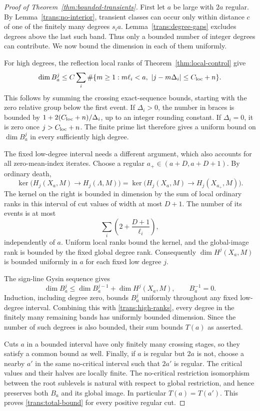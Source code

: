 \begin{proof}[Proof of Theorem~\ref{thm:bounded-transients}]
First let $a$ be large with $2a$ regular.  By
Lemma~\ref{trans:no-interior}, transient classes can occur only within
distance $c$ of one of the finitely many degrees $s_i a$.
Lemma~\ref{trans:degree-gaps} excludes degrees above the last such
band.  Thus only a bounded number of integer degrees can contribute.
We now bound the dimension in each of them uniformly.

For high degrees, the reflection local ranks of
Theorem~\ref{thm:local-control} give
\begin{equation}\label{trans:high-ranks}
 \dim B_a^j
 \le C\sum_i\#\{m\ge1:m\ell_i<a,\ |j-m\Delta_i|\le C_{\rm loc}+n\}.
\end{equation}
This follows by summing the crossing exact-sequence bounds, starting
with the zero relative group below the first event.
If $\Delta_i>0$, the number in braces is bounded by
$1+2(C_{\rm loc}+n)/\Delta_i$, up to an integer rounding constant.
If $\Delta_i=0$, it is zero once $j>C_{\rm loc}+n$.
The finite prime list therefore gives a uniform bound on
$\dim B_a^j$ in every sufficiently high degree.

The fixed low-degree interval needs a different argument, which also
accounts for all zero-mean-index iterates.  Choose a regular
$a_+\in(a+D,a+D+1)$.  By ordinary death,
\begin{equation}\label{trans:kernel-window}
 \ker\bigl(H_j(X_a,M)\to H_j(\Lambda,M)\bigr)
 =\ker\bigl(H_j(X_a,M)\to H_j(X_{a_+},M)\bigr).
\end{equation}
The kernel on the right is bounded in dimension by the sum of local
ordinary ranks in this interval of cut values of width at most $D+1$.  The number
of its events is at most
\[
 \sum_i\left(2+\frac{D+1}{\ell_i}\right),
\]
independently of $a$.  Uniform local ranks bound the kernel, and the
global-image rank is bounded by the fixed global degree rank.
Consequently $\dim H^j(X_a,M)$ is bounded uniformly in $a$ for each
fixed low degree $j$.

The sign-line Gysin sequence gives
\[
 \dim B_a^j\le\dim B_a^{j-1}+\dim H^j(X_a,M),
 \qquad B_a^{-1}=0.
\]
Induction, including degree zero, bounds $B_a^j$ uniformly throughout
any fixed low-degree interval.  Combining this with
\eqref{trans:high-ranks}, every degree in the finitely many remaining
bands has uniformly bounded dimension.  Since the number of such
degrees is also bounded, their sum bounds $T(a)$ as asserted.

Cuts $a$ in a bounded interval have only finitely many crossing stages,
so they satisfy a common bound as well.  Finally, if $a$ is regular but
$2a$ is not, choose a nearby $a'$ in the same no-critical interval such
that $2a'$ is regular.  The critical values and their halves are locally
finite.  The no-critical restriction isomorphism between the root
sublevels is natural with respect to global restriction, and hence
preserves both $B_a$ and its global image.  In particular
$T(a)=T(a')$.  This proves \eqref{trans:total-bound} for every positive
regular cut.
\end{proof}

